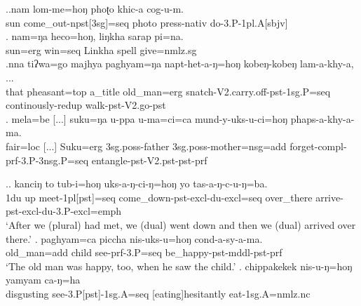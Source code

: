	\ex.\ag.nam lom-me=hoŋ phoʈo khic-a cog-u-m.\\
	sun come\_out{\sc -npst[3sg]=seq} photo press{\sc -nativ} do{\sc -3.P-1pl.A[sbjv]}\\
	\bg.         nam=ŋa   heco=hoŋ,                        liŋkha   sarap pi=na.\\
	sun{\sc =erg} win{\sc [pst;3.P]=seq} Linkha spell give{\sc [pst;3.P]=nmlz.sg}\\
	 
	\bg.nna  tiʔwa=go       majhya                 paghyam=ŋa   napt-het-a-ŋ=hoŋ                         kobeŋ-kobeŋ       lam-a-khy-a, ...\\
	that pheasant{\sc =top} a\_title  old\_man{\sc =erg} snatch{\sc -V2.carry.off-pst-1sg.P=seq} continously-{\sc redup} walk{\sc [3sg]-pst-V2.go-pst}\\
	 
\bg.   mela=be [...] suku=ŋa     u-ppa             u-ma=ci=ca                        mund-y-uks-u-ci=hoŋ                           phaps-a-khy-a-ma. \\
fair{\sc =loc} [...] Suku{\sc =erg} {\sc 3sg.poss-}father {\sc 3sg.poss-}mother{\sc =nsg=add} forget{\sc -compl-prf-3.P-3nsg.P=seq} entangle{\sc [3sg]-pst-V2.pst-pst-prf}\\
 


\ex.\ag.	kanciŋ to tub-i=hoŋ uks-a-ŋ-ci-ŋ=hoŋ  yo tas-a-ŋ-c-u-ŋ=ba.\\
			{\sc 1du} up meet{\sc -1pl[pst]=seq}  come\_down-{\sc pst-excl-du-excl=seq}  over\_there arrive{\sc -pst-excl-du-3.P-excl=emph}\\
			‘After we (plural) had met, we (dual) went down and then we (dual) arrived over there.’ 
	\bg.	paghyam=ca piccha nis-uks-u=hoŋ cond-a-sy-a-ma.\\
			old\_man={\sc add} child  see{\sc -prf-3.P=seq}  be\_happy{\sc [3sg]-pst-mddl-pst-prf}\\
			‘The old man was happy, too, when he saw the child.’ 
	\bg.		chippakekek nis-u-ŋ=hoŋ yamyam ca-ŋ=ha\\
	disgusting see{\sc -3.P[pst]-1sg.A=seq} [eating]hesitantly eat{\sc [pst]-1sg.A=nmlz.nc}\\
			
